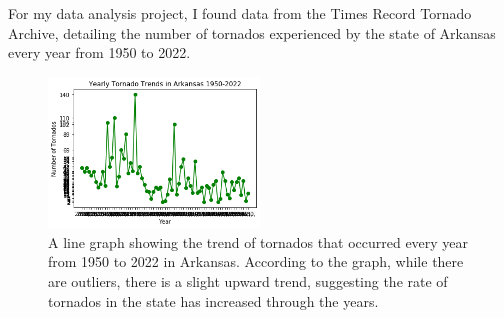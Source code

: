 \documentclass{article}
\author{Carol Stover}
\begin{document}
For my data analysis project, I found data from the Times Record Tornado Archive, detailing the number of tornados
experienced by the state of Arkansas every year from 1950 to 2022. 

\begin{figure}[h]
\begin{center}
\includegraphics[width=0.5\textwidth]{line_graph}

\caption{A line graph showing the trend of tornados that occurred every year from 1950 to 2022 in Arkansas. 
         According to the graph, while there are outliers, there is a slight upward trend, suggesting the rate of tornados in the state has increased through the years.}
\end{center}
\label{fig:line_graph}
\end{figure}
\end{document}
